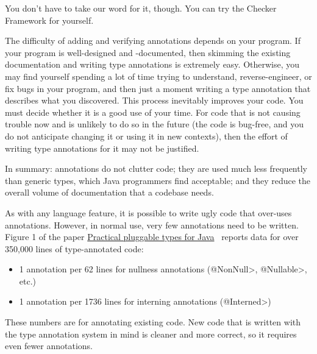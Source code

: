 You don't have to take our word for it, though.  You can try the
Checker Framework for yourself.

The difficulty of adding and verifying annotations depends on your program.
If your program is well-designed and -documented, then skimming the
existing documentation and writing type annotations is extremely easy.
Otherwise, you may find yourself spending a lot of time trying to
understand, reverse-engineer, or fix bugs in your program, and then just a
moment writing a type annotation that describes what you discovered.  This
process inevitably improves your code.  You must decide whether it is a
good use of your time.  For code that is not causing trouble now and is
unlikely to do so in the future (the code is bug-free, and you do not
anticipate changing it or using it in new contexts), then the
effort of writing type annotations for it may not be justified.




In summary:  annotations do not clutter code; they are used much
less frequently than generic types, which Java programmers find acceptable;
and they reduce the overall volume of documentation that a codebase needs.

As with any language feature, it is possible to write ugly code that
over-uses annotations.  However, in normal use, very few annotations need
to be written.  Figure 1 of the paper
\href{https://homes.cs.washington.edu/~mernst/pubs/pluggable-checkers-issta2008-abstract.html}{Practical
  pluggable types for Java}~\cite{PapiACPE2008} reports data for over
350,000 lines of type-annotated code:

\begin{itemize}
\item
    1 annotation per 62 lines for nullness annotations (\<@NonNull>, \<@Nullable>, etc.)
\item
    1 annotation per 1736 lines for interning annotations (\<@Interned>)
\end{itemize}


These numbers are for annotating existing code.  New code that
is written with the type annotation system in mind is cleaner and more
correct, so it requires even fewer annotations.

